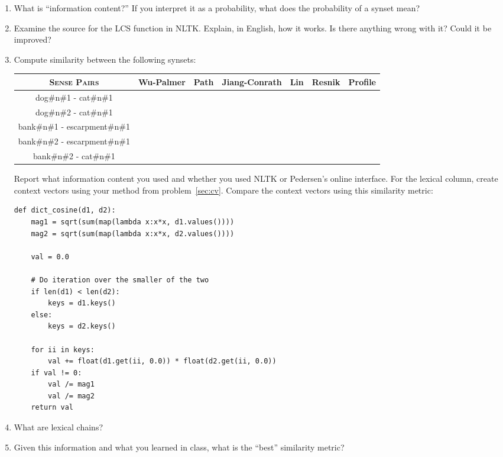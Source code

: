 \documentclass[11pt,twoside]{article}
\begin{document}
\begin{enumerate}
\item What is ``information content?''  If you interpret it as a probability, what does the probability of a synset mean?

\item Examine the source for the LCS function in NLTK.  Explain, in English, how it works.  Is there anything wrong with it?  Could it be improved?
\item Compute similarity between the following synsets:

\begin{tabular}{ccccccc}
\textsc{Sense Pairs} & Wu-Palmer & Path & Jiang-Conrath & Lin & Resnik & Profile \\
\hline
dog\#n\#1 - cat\#n\#1 & &  & & & & \\
dog\#n\#2 - cat\#n\#1 & & & & & & \\
bank\#n\#1 - escarpment\#n\#1 & & & & & & \\
bank\#n\#2 - escarpment\#n\#1 & & & & & & \\
bank\#n\#2 - cat\#n\#1 & & & & & & \\
\end{tabular}

Report what information content you used and whether you used NLTK or Pedersen's online interface.  For the lexical column, create context vectors using your method from problem~\ref{sec:cv}.  Compare the context vectors using this similarity metric:

\begin{verbatim}
def dict_cosine(d1, d2):
    mag1 = sqrt(sum(map(lambda x:x*x, d1.values())))
    mag2 = sqrt(sum(map(lambda x:x*x, d2.values())))

    val = 0.0

    # Do iteration over the smaller of the two
    if len(d1) < len(d2):
        keys = d1.keys()
    else:
        keys = d2.keys()

    for ii in keys:
        val += float(d1.get(ii, 0.0)) * float(d2.get(ii, 0.0))
    if val != 0:
        val /= mag1
        val /= mag2
    return val
\end{verbatim}

\item What are lexical chains?

\item Given this information and what you learned in class, what is the ``best'' similarity metric?
\end{enumerate}
\end{document}

